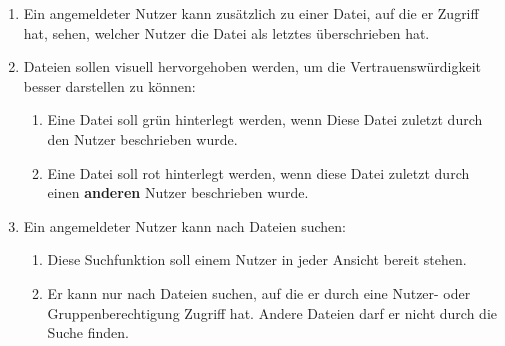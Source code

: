 \documentclass[12pt,DIV14,BCOR10mm,a4paper,parskip=half-,headsepline,headinclude,english,ngerman,bibliography=totocnumbered]{scrreprt}
\begin{document}
\begin{enumerate}
    \item Ein angemeldeter Nutzer kann zusätzlich zu einer Datei, auf die er Zugriff hat, sehen, welcher Nutzer die Datei als letztes überschrieben hat.
    \item Dateien sollen visuell hervorgehoben werden, um die Vertrauenswürdigkeit besser darstellen zu können:
    \begin{enumerate}
        \item Eine Datei soll grün hinterlegt werden, wenn Diese Datei zuletzt durch den Nutzer beschrieben wurde.
        \item Eine Datei soll rot hinterlegt werden, wenn diese Datei zuletzt durch einen \textbf{anderen} Nutzer beschrieben wurde.
    \end{enumerate}
    \item Ein angemeldeter Nutzer kann nach Dateien suchen:
    \begin{enumerate}
        \item Diese Suchfunktion soll einem Nutzer in jeder Ansicht bereit stehen.
        \item Er kann nur nach Dateien suchen, auf die er durch eine Nutzer- oder Gruppenberechtigung Zugriff hat. Andere Dateien darf er nicht durch die Suche finden.
    \end{enumerate}
\end{enumerate}

\printbibliography

\printacronyms[title=Abkürzungsverzeichnis,toctitle=Abkürzungsverzeichnis]
\printglossary[title=Glossar,toctitle=Glossar,type=main]

\iftotalfigures
  \listoffigures
\fi


\begin{appendices}

\end{appendices}
\end{document}
